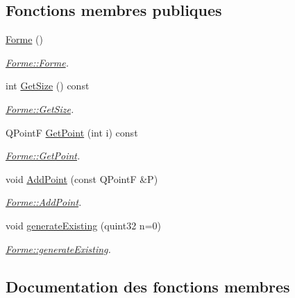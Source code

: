 \subsection*{Fonctions membres publiques}
\begin{DoxyCompactItemize}
\item 
\hypertarget{class_forme_a3c97c1066856b548d2fe6db963a28800}{}\hyperlink{class_forme_a3c97c1066856b548d2fe6db963a28800}{Forme} ()\label{class_forme_a3c97c1066856b548d2fe6db963a28800}

\begin{DoxyCompactList}\small\item\em \hyperlink{class_forme_a3c97c1066856b548d2fe6db963a28800}{Forme\+::\+Forme}. \end{DoxyCompactList}\item 
int \hyperlink{class_forme_a18a45c488d85542be6643203164411f7}{Get\+Size} () const 
\begin{DoxyCompactList}\small\item\em \hyperlink{class_forme_a18a45c488d85542be6643203164411f7}{Forme\+::\+Get\+Size}. \end{DoxyCompactList}\item 
Q\+Point\+F \hyperlink{class_forme_a6af2d02eca70f05c8f9104398fd495b2}{Get\+Point} (int i) const 
\begin{DoxyCompactList}\small\item\em \hyperlink{class_forme_a6af2d02eca70f05c8f9104398fd495b2}{Forme\+::\+Get\+Point}. \end{DoxyCompactList}\item 
void \hyperlink{class_forme_a1d74e380c02058ba990a4b00459f2181}{Add\+Point} (const Q\+Point\+F \&P)
\begin{DoxyCompactList}\small\item\em \hyperlink{class_forme_a1d74e380c02058ba990a4b00459f2181}{Forme\+::\+Add\+Point}. \end{DoxyCompactList}\item 
void \hyperlink{class_forme_a82ab6fef4abe9d70d1dcf79824010a8a}{generate\+Existing} (quint32 n=0)
\begin{DoxyCompactList}\small\item\em \hyperlink{class_forme_a82ab6fef4abe9d70d1dcf79824010a8a}{Forme\+::generate\+Existing}. \end{DoxyCompactList}\end{DoxyCompactItemize}


\subsection{Documentation des fonctions membres}
\hypertarget{class_forme_a1d74e380c02058ba990a4b00459f2181}{}
